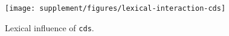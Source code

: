 \begin{wrapfigure}[7]{O}{0.5\textwidth}
  \vspace{-30pt}
  \centering

  \texttt{[image: supplement/figures/lexical-interaction-cds]}

  \caption{Lexical influence of \texttt{cds}.}
  \label{fig:lexical-cds}
\end{wrapfigure}
